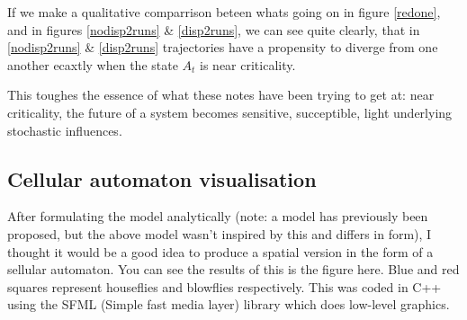 If we make a qualitative comparrison beteen whats going on in figure \ref{redone}, and in figures \ref{nodisp2runs} \& \ref{disp2runs}, we can see quite clearly, that in \ref{nodisp2runs} \& \ref{disp2runs} trajectories have a propensity to diverge from one another ecaxtly when the state $A_t$ is near criticality.\par
This toughes the essence of what these notes have been trying to get at: near criticality, the future of a system becomes sensitive, succeptible, light underlying stochastic influences. 


\subsection*{Cellular automaton visualisation}

After formulating the model analytically (note: a model has previously been proposed,  \cite{pease1984evolutionary} but the above model wasn't inspired by this and differs in form),  I thought it would be a good idea to produce a spatial version in the form of a sellular automaton. You can see the results of this is the figure here. Blue and red squares represent houseflies and blowflies respectively. This was coded in C++ using the SFML (Simple fast media layer) library which does low-level graphics. 



